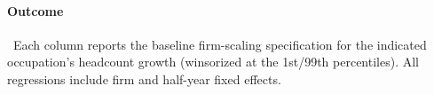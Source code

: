 \documentclass{article}
\begin{document}
\paragraph{Outcome}\ Each column reports the baseline firm-scaling specification for the indicated occupation's headcount growth (winsorized at the 1st/99th percentiles). All regressions include firm and half-year fixed effects.


\end{document}
